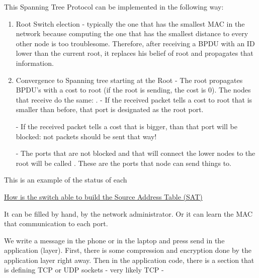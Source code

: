 This Spanning Tree Protocol can be implemented in the following way:
\begin{enumerate}
    \item Root Switch election - typically the one that has the smallest MAC in the network because computing the one that has the smallest distance to every other node is too troublesome. Therefore, after receiving a BPDU with an ID lower than the current root, it replaces his belief of root and propagates that information.
    \item Convergence to Spanning tree starting at the Root - The root propagates BPDU's with a cost to root (if the root is sending, the cost is 0). The nodes that receive do the same: . 
    - If the received packet tells a cost to root that is smaller than before, that port is designated as the root port. 

    - If the received packet tells a cost that is bigger, than that port will be blocked: not packets should be sent that way!

    - The ports that are not blocked and that will connect the lower nodes to the root will be called . These are the ports that node can send things to.                                                                                                                                                                                                                                                                                                    
\end{enumerate}


This is an example of the status of each 




\ul{How is the switch able to build the Source Address Table (SAT)}

It can be filled by hand, by the network administrator. Or it can learn the MAC that communication to each port.




\begin{center}
We write a message in the phone or in the laptop and press send in the application (layer). First, there is some compression and encryption done by the application layer right away. Then in the application code, there is a section that is defining TCP or UDP sockets - very likely TCP - 

\end{center}


